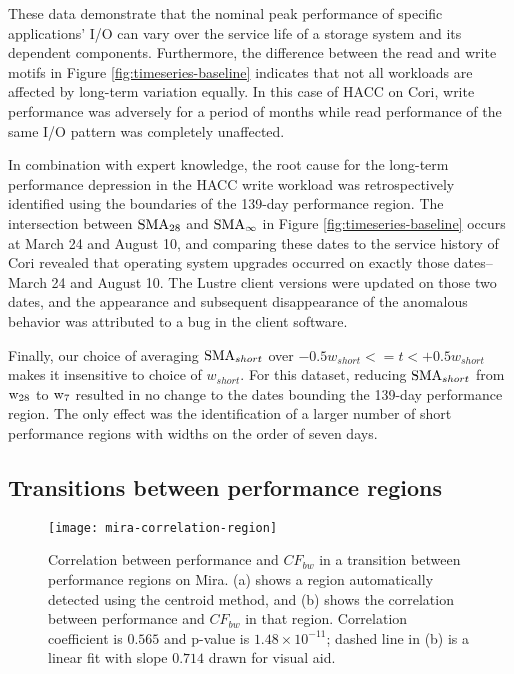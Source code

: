 These data demonstrate that the nominal peak performance of specific applications' I/O can vary over the service life of a storage system and its dependent components.
Furthermore, the difference between the read and write motifs in Figure \ref{fig:timeseries-baseline} indicates that not all workloads are affected by long-term variation equally. 
In this case of HACC on Cori, write performance was adversely for a period of months while read performance of the same I/O pattern was completely unaffected.

In combination with expert knowledge, the root cause for the long-term performance depression in the HACC write workload was retrospectively identified using the boundaries of the 139-day performance region.
The intersection between $\textup{SMA}_{28}$ and $\textup{SMA}_\infty$ in Figure \ref{fig:timeseries-baseline} occurs at March 24 and August 10, and comparing these dates to the service history of Cori revealed that operating system upgrades occurred on exactly those dates--March 24 and August 10.
The Lustre client versions were updated on those two dates, and the appearance and subsequent disappearance of the anomalous behavior was attributed to a bug in the client software.

Finally, our choice of averaging $\textup{SMA}_{short}$ over ${-0.5w_{short} <= t < +0.5w_{short}}$ makes it insensitive to choice of $w_{short}$.
For this dataset, reducing $\textup{SMA}_{short}$ from $\textup{w}_{28}$ to $\textup{w}_{7}$ resulted in no change to the dates bounding the 139-day performance region.
The only effect was the identification of a larger number of short performance regions with widths on the order of seven days.





\subsection{Transitions between performance regions} \label{sec:results/transitions}

\begin{figure}
    \centering
    \texttt{[image: mira-correlation-region]}
    \vspace{-.35in}
    \caption{Correlation between performance and $CF_{bw}$ in a transition between performance regions on Mira. (a) shows a region automatically detected using the centroid method, and (b) shows the correlation between performance and $CF_{bw}$ in that region.  Correlation coefficient is $0.565$ and p-value is ${1.48 \times 10^{-11}}$; dashed line in (b) is a linear fit with slope $0.714$ drawn for visual aid.}
    \label{fig:mira-correlation-region}
\end{figure}

